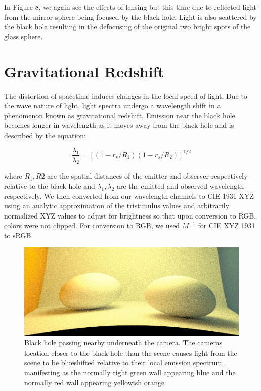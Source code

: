 \documentclass[sigconf]{acmart}
\begin{document}
In Figure 8, we again see the effects of lensing but this time due to reflected light from the mirror sphere being focused by the black hole.  Light is also scattered by the black hole resulting in the defocusing of the original two bright spots of the glass sphere.

\section{Gravitational Redshift}

The distortion of spacetime induces changes in the local speed of light. Due to the wave nature of light, light spectra undergo a wavelength shift in a phenomenon known as gravitational redshift. Emission near the black hole becomes longer in wavelength as it moves away from the black hole and is described by the equation\cite{wikipedia_2019}:

\begin{displaymath}
  \frac{\lambda_1}{\lambda_2} = [(1 - r_s / R_1)(1 - r_s/R_2)]^{1/2}
\end{displaymath}

where $R_1, R2$ are the spatial distances of the emitter and observer respectively relative to the black hole and $\lambda_1, \lambda_2$ are the emitted and observed wavelength respectively. We then converted from our wavelength channels to CIE 1931 XYZ using an analytic approximation of the tristimulus values\cite{wyman_sloan_shirley_2013} and arbitrarily normalized XYZ values to adjust for brightness so that upon conversion to RGB, colors were not clipped. For conversion to RGB, we used  $M^{-1}$ for CIE XYZ 1931 to sRGB\cite{wikipedia_2019_3}.

\begin{figure}[h]
  \centering
  \includegraphics[width=\linewidth]{blueshift.png}
  \caption{Black hole passing nearby underneath the camera.  The cameras location closer to the black hole than the scene causes light from the scene to be blueshifted relative to their local emission spectrum, manifesting as the normally right green wall appearing blue and the normally red wall appearing yellowish orange}
  \Description{}
\end{figure}
\end{document}
